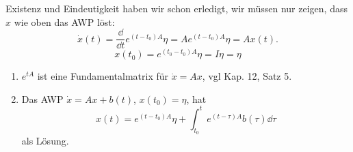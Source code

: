 \begin{beweis}
	Existenz und Eindeutigkeit haben wir schon erledigt, wir m\"ussen nur zeigen, dass $ x $ wie oben das AWP l\"ost:
	\[ \dot x(t)=\frac{\dd}{\dd t}e^{(t-t_0)A}\eta=Ae^{(t-t_0)A}\eta=Ax(t). \]
	\[ x(t_0)=e^{(t_0-t_0)A}\eta=I\eta=\eta \]
\end{beweis}
\begin{korollar}
	\bullshit
	\begin{enumerate}
		\item $ e^{tA} $ ist eine Fundamentalmatrix f\"ur $ \dot x=Ax $, vgl Kap. 12, Satz 5.
		\item Das AWP $ \dot x=Ax+b(t) $, $ x(t_0)=\eta $, hat
		\[ x(t)=e^{(t-t_0)A}\eta+\int_{t_0}^te^{(t-\tau)A}b(\tau)\dd\tau \]
		als L\"osung.
	\end{enumerate}
\end{korollar}